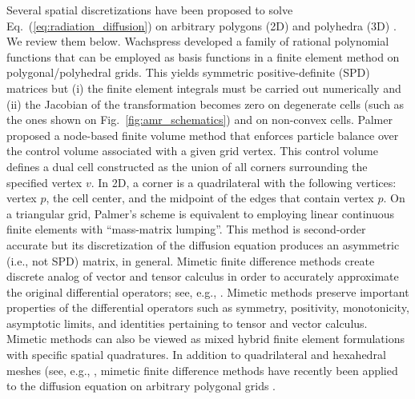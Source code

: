 \documentclass[preprint,10pt]{elsarticle}
\newcommand{\eqt}[1]{Eq.~(\ref{#1})}                     %
\newcommand{\fig}[1]{Fig.~\ref{#1}}                      %
\begin{document}
Several spatial discretizations have been proposed to solve \eqt{eq:radiation_diffusion} on
arbitrary polygons (2D) and polyhedra (3D) \cite{Wachspress,Kuznetsov2004,Palmer2005,Brezzi2005,
LipnikovShashkovSvyatskiy2006,BaileyAdams2008}. We review them below.
%
Wachspress \cite{Wachspress} developed a family of rational polynomial functions that can be employed
as basis functions in a finite element method on polygonal/polyhedral grids. This yields
symmetric positive-definite (SPD) matrices but (i) the finite element integrals must be carried out 
numerically and (ii) the Jacobian of the transformation becomes zero on degenerate cells 
(such as the ones shown on \fig{fig:amr_schematics}) and on non-convex cells. 
%
Palmer \cite{Palmer2005,PalmerLLNL} proposed a node-based finite volume method 
that enforces particle balance over the control volume associated with a given grid vertex.
This control volume defines a dual cell constructed as 
the union of all corners surrounding the specified vertex $v$. In 2D, a corner 
is a quadrilateral with the following vertices: vertex $p$, the cell center, and the midpoint
of the edges that contain vertex $p$. On a triangular grid, Palmer's scheme is equivalent 
to employing linear continuous finite elements with ``mass-matrix lumping''. This method is 
second-order accurate but its discretization of the diffusion equation produces an 
asymmetric (i.e., not SPD) matrix, in general.
%
Mimetic finite difference methods create discrete analog of vector and tensor
calculus in order to accurately approximate the original differential operators;
see, e.g., \cite{HymanMorelShashkovSteinberg2002}.
Mimetic methods preserve important properties of the differential operators such 
as symmetry, positivity, monotonicity, asymptotic limits, and identities pertaining 
to tensor and vector calculus. Mimetic methods can also be viewed as mixed hybrid 
finite element formulations with specific spatial quadratures.  
In addition to quadrilateral and hexahedral meshes (see, e.g., 
\cite{MorelRobertsShashkov1998,MorelHallShashkov2001}, mimetic finite difference 
methods have recently been applied to the diffusion equation on arbitrary polygonal 
grids \cite{Kuznetsov2004,Brezzi2005,LipnikovShashkovSvyatskiy2006,LipnikovShashkov2010}.
\end{document}
